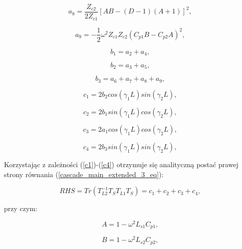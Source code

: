 \begin{equation}
   a_8 = \frac{Z_{c2}}{2Z_{c1}}[AB-(D-1)(A+1)]^2 \text{,}
\end{equation}

\begin{equation}
    a_9 = -\frac{1}{2}\omega^2Z_{c1}Z_{c2}(C_{p1}B-C_{p2}A)^2 \text{,}
\end{equation}



\begin{equation}
    b_1 = a_2 + a_4 \text{,}
\end{equation}

\begin{equation}
    b_2 = a_3 + a_5 \text{,}
\end{equation}

\begin{equation}
    b_3 = a_6 + a_7 + a_8 + a_9 \text{,}
\end{equation}

\begin{equation}
\label{c1}
    c_1 = 2 b_2 cos(\gamma_1L)sin(\gamma_2L) \text{,}
\end{equation}

\begin{equation}
    c_2 = 2 b_1 sin(\gamma_1L)cos(\gamma_2L) \text{,}
\end{equation}

\begin{equation}
    c_3 = 2 a_1 cos(\gamma_1L)cos(\gamma_2L) \text{,}
\end{equation}

\begin{equation}
\label{c4}
    c_4 = 2 b_3 sin(\gamma_1L)sin(\gamma_2L) \text{,}
\end{equation}

\noindent Korzystając z zależności (\ref{c1})-(\ref{c4}) otrzymuje się analityczną postać prawej strony równania (\ref{cascade_main_extended_3_eq}):

\begin{equation}
\label{eq:trace_analitycal}
     RHS=Tr\left(T_{L2}^{-1}T_ST_{L1}T_S\right) = c_1 + c_2 + c_3 + c_4 \text{,}
\end{equation}

\noindent przy czym:

\begin{equation}
    A = 1 - \omega^2L_{s1}C_{p1} \text{,}
\end{equation}

\begin{equation}
    B = 1 - \omega^2L_{s2}C_{p2} \text{,}
\end{equation}

